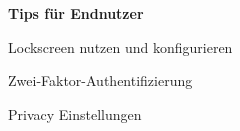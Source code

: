 \begin{frame}
	\centering
	\textbf{Tips für Endnutzer}
    		\begin{block}{}
				Lockscreen nutzen und konfigurieren
			\end{block}
			\begin{block}{}
				Zwei-Faktor-Authentifizierung
			\end{block}
			\begin{block}{}
				Privacy Einstellungen
			\end{block}
\end{frame}